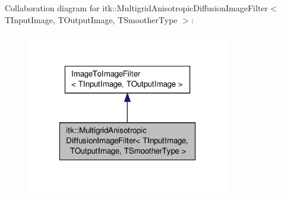 Collaboration diagram for itk\-:\-:Multigrid\-Anisotropic\-Diffusion\-Image\-Filter$<$ T\-Input\-Image, T\-Output\-Image, T\-Smoother\-Type $>$\-:
\nopagebreak
\begin{figure}[H]
\begin{center}
\leavevmode
\includegraphics[width=250pt]{classitk_1_1_multigrid_anisotropic_diffusion_image_filter__coll__graph}
\end{center}
\end{figure}
